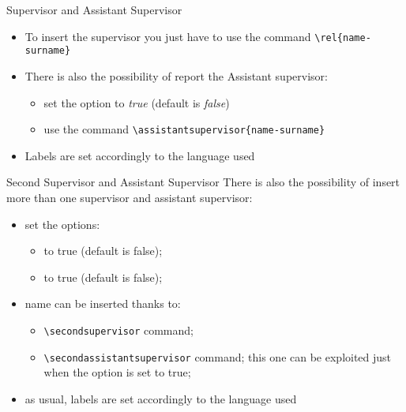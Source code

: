 \begin{frame}[t,fragile]{Supervisor and Assistant Supervisor}\label{secondrel}
\begin{itemize}
\item To insert the supervisor you just have to use the command \verb!\rel{name-surname}!
\item There is also the possibility of report the Assistant supervisor:
\begin{itemize}
\item set the option  to \emph{true} (default is \emph{false})
\item use the command \verb!\assistantsupervisor{name-surname}!
\end{itemize}
\item Labels are set accordingly to the language used
\end{itemize}
\end{frame}

\begin{frame}[t,fragile]{Second Supervisor and Assistant Supervisor}
There is also the possibility of insert more than one supervisor and assistant supervisor:
\begin{itemize}
\item set the options:
\begin{itemize}
\item {} to true (default is false);
\item {} to true (default is false);
\end{itemize}
\item name can be inserted thanks to:
\begin{itemize}
\item \verb!\secondsupervisor! command;
\item \verb!\secondassistantsupervisor! command; this one can be exploited just when the  option is set to true;
\end{itemize}
\item as usual, labels are set accordingly to the language used
\end{itemize}
\end{frame}

